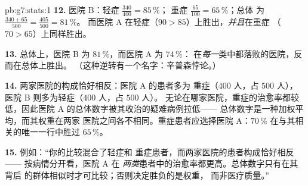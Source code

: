 \begin{solution}{pb:g7:stats:1}
\textbf{12.} 医院 B：轻症 $\frac{340}{400} = 85\,\%$；
重症 $\frac{65}{100} = 65\,\%$；总体
为 $\frac{340 + 65}{500} = \frac{405}{500} = 81\,\%$。
而医院 A 在轻症（$90 > 85$）上胜出，\emph{并且}在重症
（$70 > 65$）上同样胜出。

\textbf{13.} 总体上，医院 B 为 $81\,\%$，而医院 A 为 $74\,\%$：
在\emph{每一}类中都落败的医院，反而在总体上胜出。
（这种逆转有一个名字：辛普森悖论。）

\textbf{14.} 两家医院的构成恰好相反：医院 A 的患者多为
重症（$400$ 人，占 $500$ 人），医院 B 则多为轻症（$400$ 人，占 $500$ 人）。
无论在哪家医院，重症的治愈率都较低，因此医院 A
的总体数字被其收治的疑难病例拉低——
总体数字是一种加权平均，而其权重在两家
医院之间各不相同。重症患者应选择医院 A：$70\,\%$
在与其相关的唯一一行中胜过 $65\,\%$。

\textbf{15.} 例如：“你的比较混合了轻症和
重症患者，而两家医院的患者构成恰好相反——
按病情分开看，医院 A 在
\emph{两类}患者中的治愈率都更高。总体数字只有在其背后
的群体相似时才可比较；否则决定胜负的是权重，
而非医疗质量。”
\end{solution}
